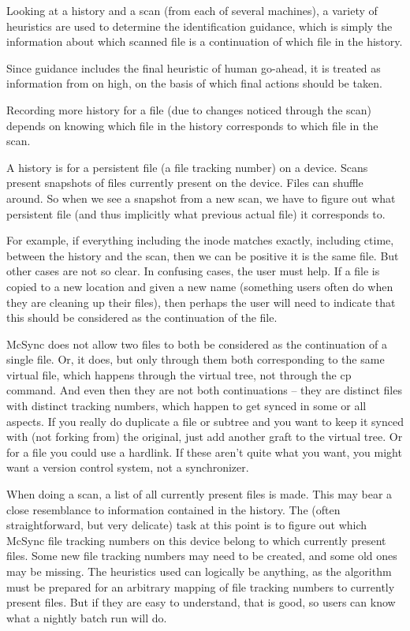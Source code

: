\documentclass{book}
\begin{document}
Looking at a history and a scan (from each of several machines), a variety of heuristics are used to determine the identification guidance, which is simply the information about which scanned file is a continuation of which file in the history.

Since guidance includes the final heuristic of human go-ahead, it is treated as information from on high, on the basis of which final actions should be taken.

Recording more history for a file (due to changes noticed through the scan) depends on knowing which file in the history corresponds to which file in the scan.

A history is for a persistent file (a file tracking number) on a device.  Scans present snapshots of files currently present on the device.  Files can shuffle around.  So when we see a snapshot from a new scan, we have to figure out what persistent file (and thus implicitly what previous actual file) it corresponds to.

For example, if everything including the inode matches exactly, including ctime, between the history and the scan, then we can be positive it is the same file.
But other cases are not so clear.  In confusing cases, the user must help.
If a file is copied to a new location and given a new name (something users often do when they are cleaning up their files), then perhaps the user will need to indicate that this should be considered as the continuation of the file.

McSync does not allow two files to both be considered as the continuation of a single file.  Or, it does, but only through them both corresponding to the same virtual file, which happens through the virtual tree, not through the cp command.  And even then they are not both continuations -- they are distinct files with distinct tracking numbers, which happen to get synced in some or all aspects.  If you really do duplicate a file or subtree and you want to keep it synced with (not forking from) the original, just add another graft to the virtual tree.  Or for a file you could use a hardlink.  If these aren't quite what you want, you might want a version control system, not a synchronizer.

When doing a scan, a list of all currently present files is made.  This may bear a close resemblance to information contained in the history.  The (often straightforward, but very delicate) task at this point is to figure out which McSync file tracking numbers on this device belong to which currently present files.  Some new file tracking numbers may need to be created, and some old ones may be missing.  The heuristics used can logically be anything, as the algorithm must be prepared for an arbitrary mapping of file tracking numbers to currently present files.  But if they are easy to understand, that is good, so users can know what a nightly batch run will do.
\end{document}
